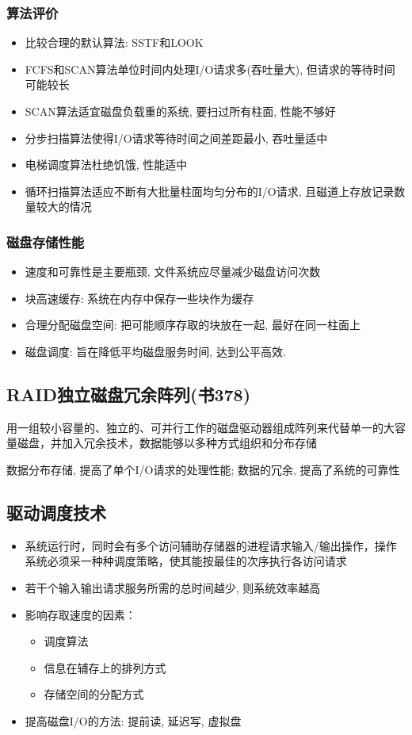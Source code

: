 \documentclass[a4paper, UTF8]{article}
\begin{document}
\subsubsection{算法评价}
\begin{itemize}
\item 比较合理的默认算法: SSTF和LOOK
\item FCFS和SCAN算法单位时间内处理I/O请求多(吞吐量大), 但请求的等待时间可能较长
\item SCAN算法适宜磁盘负载重的系统, 要扫过所有柱面, 性能不够好
\item 分步扫描算法使得I/O请求等待时间之间差距最小, 吞吐量适中
\item 电梯调度算法杜绝饥饿, 性能适中
\item 循环扫描算法适应不断有大批量柱面均匀分布的I/O请求, 且磁道上存放记录数量较大的情况
\end{itemize}
\subsubsection{磁盘存储性能}
\begin{itemize}
\item 速度和可靠性是主要瓶颈, 文件系统应尽量减少磁盘访问次数
\item 块高速缓存: 系统在内存中保存一些块作为缓存
\item 合理分配磁盘空间: 把可能顺序存取的块放在一起, 最好在同一柱面上
\item 磁盘调度: 旨在降低平均磁盘服务时间, 达到公平高效.
\end{itemize}

\subsection{RAID独立磁盘冗余阵列(书378)}
用一组较小容量的、独立的、可并行工作的磁盘驱动器组成阵列来代替单一的大容量磁盘，并加入冗余技术，数据能够以多种方式组织和分布存储\par
数据分布存储, 提高了单个I/O请求的处理性能; 数据的冗余, 提高了系统的可靠性

\subsection{驱动调度技术}
\begin{itemize}
\item 系统运行时，同时会有多个访问辅助存储器的进程请求输入/输出操作，操作系统必须采一种种调度策略，使其能按最佳的次序执行各访问请求
\item 若干个输入输出请求服务所需的总时间越少, 则系统效率越高
\item 影响存取速度的因素：
	\begin{itemize}
	\item 调度算法
	\item 信息在辅存上的排列方式
	\item 存储空间的分配方式
	\end{itemize}
\item 提高磁盘I/O的方法: 提前读, 延迟写, 虚拟盘
\end{itemize}
\end{document}
